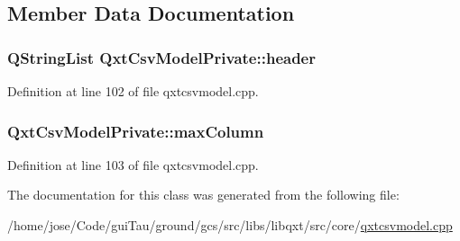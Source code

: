 \subsection{Member Data Documentation}
\hypertarget{class_qxt_csv_model_private_add6903d5c736a84fc6bc2962a367d088}{
\subsubsection[{header}]{\setlength{\rightskip}{0pt plus 5cm}Q\-String\-List Qxt\-Csv\-Model\-Private\-::header}}\label{class_qxt_csv_model_private_add6903d5c736a84fc6bc2962a367d088}


Definition at line 102 of file qxtcsvmodel.\-cpp.

\hypertarget{class_qxt_csv_model_private_a5a785e4ff82f75bac941fbf917439224}{
\subsubsection[{max\-Column}]{ Qxt\-Csv\-Model\-Private\-::max\-Column}}\label{class_qxt_csv_model_private_a5a785e4ff82f75bac941fbf917439224}


Definition at line 103 of file qxtcsvmodel.\-cpp.



The documentation for this class was generated from the following file\-:\begin{DoxyCompactItemize}
\item 
/home/jose/\-Code/gui\-Tau/ground/gcs/src/libs/libqxt/src/core/\hyperlink{qxtcsvmodel_8cpp}{qxtcsvmodel.\-cpp}\end{DoxyCompactItemize}
